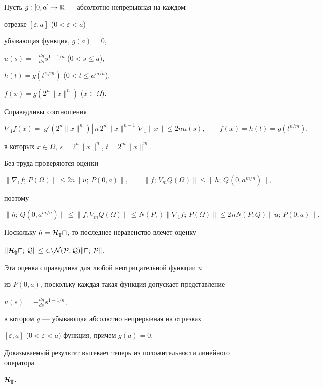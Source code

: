 \begin{pf} Пусть $g:[0,a]\to \Bbb R$ --- абсолютно непрерывная на каждом 


отрезке $[\varepsilon,a]$ ($0<\varepsilon<a$) 


убывающая функция, $g(a)=0$, 


$u(s)=-\frac{dg}{ds}s^{1-1/n}$ ($0<s\le a$), 


$h(t)=g(t^{n/m})$ ($0<t\le a^{m/n}$), 


$f(x)=g(2^n\|x\|^n)$ ($x\in \Omega$). 


Справедливы соотношения 


$$ 


\nabla_1f(x)=|g'(2^n\|x\|^n)|\,n\,2^n\|x\|^{n-1}\nabla_1\|x\| 


\le 2nu(s), \qquad 


f(x)=h(t)=g(t^{n/m}), 


$$ 


в которых $x\in\Omega$, $s=2^n\|x\|^n$, $t=2^m\|x\|^m$. 


Без труда проверяются оценки 


$$ 


\|\nabla_1f;\,P(\Omega)\|\le 2n\|u;\,P(0,a)\|,\qquad 


\|f;\,V_mQ(\Omega)\|\le \|h;\,Q(0,a^{m/n})\|, 


$$ 


поэтому 


$$ 


\|h;\,Q(0,a^{m/n})\| \le \|f;V_mQ(\Omega)\| \le 


N(P,)\|\nabla_1f;\,P(\Omega)\| \le 2nN(P,Q)\|u;\,P(0,a)\|. 


$$ 


 


Поскольку $h=\cal H_mu$, то последнее неравенство влечет оценку 


$\|\cal H_mu;\,Q\|\le 2nN(P,Q)\|u;\,P\|$. 


Эта оценка справедлива для любой неотрицательной функции $u$ 


из $P(0,a)$, поскольку каждая такая функция допускает представление 


$u(s)=-\frac{dg}{ds}s^{1-1/n}$, 


в котором $g$ --- убывающая абсолютно непрерывная на отрезках 


$[\varepsilon,a]$ ($0<\varepsilon<a$) функция, причем $g(a)=0$. 


Доказываемый результат вытекает теперь из положительности линейного оператора 


$\cal H_m$. 


\end{pf} 


